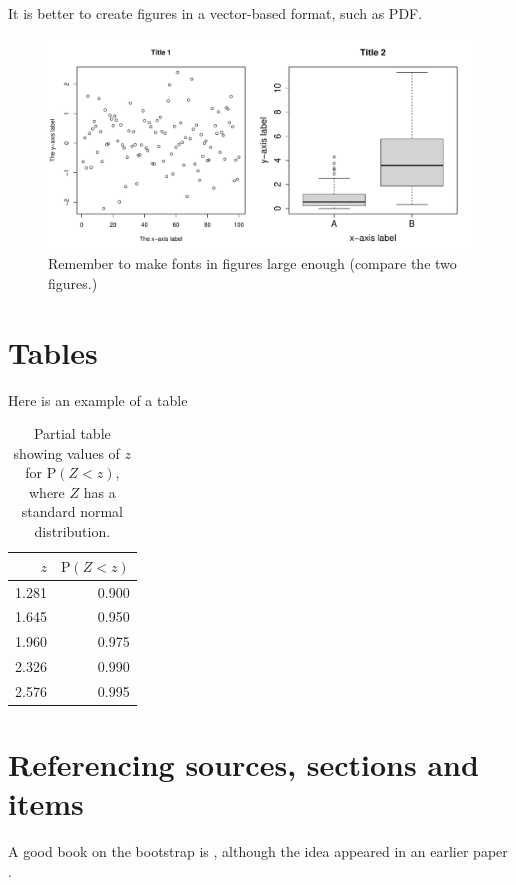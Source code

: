 \documentclass{mldsmsc}
\begin{document}
It is better to create figures in a vector-based format, such as PDF.

\begin{figure}[!h]
    \centering
    \includegraphics[width=\textwidth]{fig1.pdf}
    \caption{Remember to make fonts in figures large enough (compare the two figures.)}
    \label{fig:fig1}
\end{figure}

\section{Tables}

\label{sec:tablesection}

Here is an example of a table

\begin{table}[ht]
\centering
\begin{tabular}{rr}
  \hline
    $z$& $\textrm{P}(Z < z)$ \\
  \hline
    1.281& 0.900\\
    1.645& 0.950\\
    1.960& 0.975\\
    2.326& 0.990 \\
    2.576& 0.995 \\
   \hline
\end{tabular}
    \caption{Partial table showing values of $z$ for $\textrm{P}(Z < z)$, 
    where $Z$ has a standard normal distribution.}
    \label{tab:normal}
\end{table}



\section{Referencing sources, sections and items}

A good book on the bootstrap is \cite{efrontib}, although the idea
appeared in an earlier paper \citep{efron1979}.
\end{document}

